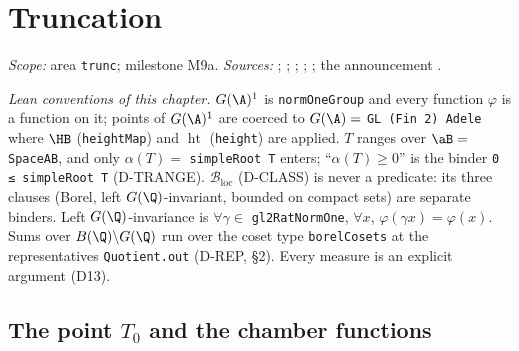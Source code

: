 
\chapter{Truncation}\label{ch:ch-06-truncation}

\noindent\emph{Scope:} area \texttt{trunc}; milestone M9a. \emph{Sources:} \cite[§§6, 8, 9, 13]{AIntro}; \cite[§1]{A-II}; \cite[§6, Lemma~6.4]{A-I};
\cite[Lecture II §§2--4, Lecture III §§2--3]{Gel}; \cite[§4]{A-R1}; the announcement \cite{A-Tr}.

\noindent\emph{Lean conventions of this chapter.} $G(\A)^1$ is \texttt{normOneGroup} and every function $\varphi$ is a function on it; points of $G(\A)^1$
are coerced to $G(\A)=$ \texttt{GL (Fin 2) Adele} where $\HB$ (\texttt{heightMap}) and $\operatorname{ht}$ (\texttt{height}) are applied. $T$ ranges over
$\aB=$ \texttt{SpaceAB}, and only $\alpha(T)=$ \texttt{simpleRoot T} enters; ``$\alpha(T)\ge0$'' is the binder \texttt{0 ≤ simpleRoot T} (D-TRANGE).
$\mathcal B_{\mathrm{loc}}$ (D-CLASS) is never a predicate: its three clauses (Borel, left $G(\Q)$-invariant, bounded on compact sets) are separate binders.
Left $G(\Q)$-invariance is $\forall\gamma\in$ \texttt{gl2RatNormOne}, $\forall x$, $\varphi(\gamma x)=\varphi(x)$. Sums over $B(\Q)\backslash G(\Q)$ run over the
coset type \texttt{borelCosets} at the representatives \texttt{Quotient.out} (D-REP, §2). Every measure is an explicit argument (D13).


\section{The point \texorpdfstring{$T_0$}{T0} and the chamber functions}\label{sec:trunc-t-zero}

